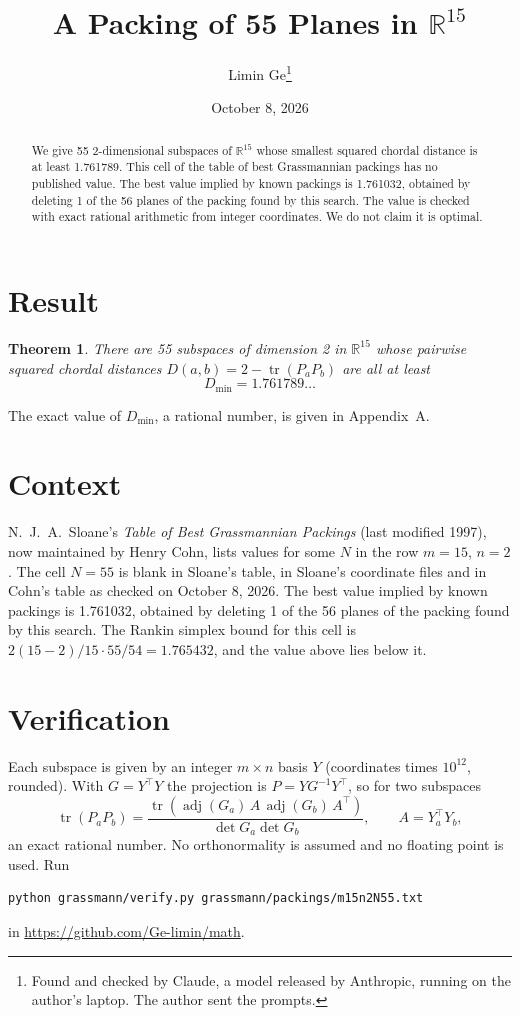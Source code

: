 \documentclass[11pt,a4paper]{article}
\title{A Packing of 55 Planes in $\mathbb{R}^{15}$}
\author{Limin Ge\thanks{Found and checked by Claude, a model released by Anthropic, running on the author's laptop. The author sent the prompts.}}
\date{October 8, 2026}
\newtheorem*{theorem}{Theorem}
\begin{document}
\maketitle
\begin{abstract}
We give 55 2-dimensional subspaces of $\mathbb{R}^{15}$ whose smallest squared chordal distance is at least 1.761789. This cell of the table of best Grassmannian packings has no published value. The best value implied by known packings is 1.761032, obtained by deleting 1 of the 56 planes of the packing found by this search. The value is checked with exact rational arithmetic from integer coordinates. We do not claim it is optimal.
\end{abstract}

\section{Result}
\begin{theorem}
There are 55 subspaces of dimension 2 in $\mathbb{R}^{15}$ whose pairwise squared chordal distances $D(a,b) = 2 - \operatorname{tr}(P_aP_b)$ are all at least
\[ D_{\min} = 1.761789\ldots \]
\end{theorem}
The exact value of $D_{\min}$, a rational number, is given in Appendix~A.


\section{Context}
N.~J.~A.~Sloane's \emph{Table of Best Grassmannian Packings} (last modified 1997), now maintained by Henry Cohn, lists values for some $N$ in the row $m=15$, $n=2$. The cell $N=55$ is blank in Sloane's table, in Sloane's coordinate files and in Cohn's table as checked on October 8, 2026. The best value implied by known packings is 1.761032, obtained by deleting 1 of the 56 planes of the packing found by this search. The Rankin simplex bound for this cell is $2(15-2)/15\cdot 55/54 = 1.765432$, and the value above lies below it.


\section{Verification}
Each subspace is given by an integer $m\times n$ basis $Y$ (coordinates times $10^{12}$, rounded). With $G=Y^\top Y$ the projection is $P=YG^{-1}Y^\top$, so for two subspaces
\[ \operatorname{tr}(P_aP_b)=\frac{\operatorname{tr}(\operatorname{adj}(G_a)\,A\,\operatorname{adj}(G_b)\,A^\top)}{\det G_a\det G_b},\qquad A=Y_a^\top Y_b, \]
an exact rational number. No orthonormality is assumed and no floating point is used. Run
\begin{verbatim}
python grassmann/verify.py grassmann/packings/m15n2N55.txt
\end{verbatim}
in \url{https://github.com/Ge-limin/math}.
\end{document}
